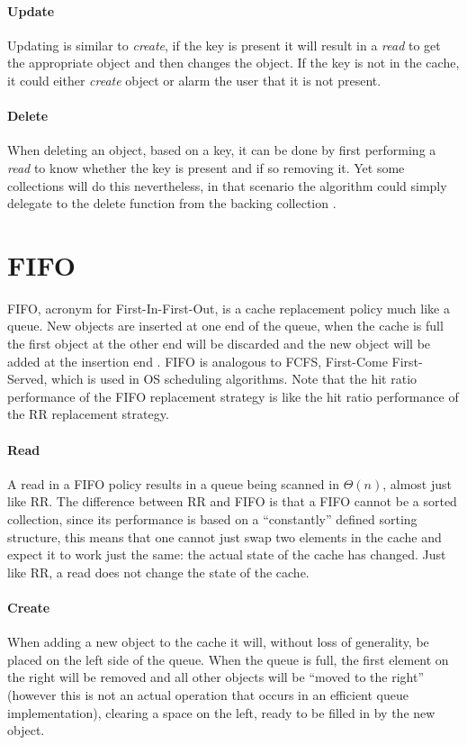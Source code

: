 \documentclass[pdftex,a4paper,12pt,twoside]{report}
\begin{document}
\paragraph{Update} Updating is similar to \emph{create}, if the key is present it will result in a \emph{read} to get the appropriate object and then changes the object. If the key is not in the cache, it could either \emph{create} object or alarm the user that it is not present.
\paragraph{Delete} When deleting an object, based on a key, it can be done by first performing a \emph{read} to know whether the key is present and if so removing it. Yet some collections will do this nevertheless, in that scenario the algorithm could simply delegate to the delete function from the backing collection \citep{random_replacement}.
\section{FIFO}
FIFO, acronym for First-In-First-Out, is a cache replacement policy much like a queue. New objects are inserted at one end of the queue, when the cache is full the first object at the other end will be discarded and the new object will be added at the insertion end \citep{reineke2007timing}. FIFO is analogous to FCFS, First-Come First-Served, which is used in OS scheduling algorithms.
Note that the hit ratio performance of the FIFO replacement strategy is like the hit ratio performance of the RR replacement strategy.
\paragraph{Read} A read in a FIFO policy results in a queue being scanned in $\Theta(n)$, almost just like RR. The difference between RR and FIFO is that a FIFO cannot be a sorted collection, since its performance is based on a ``constantly'' defined sorting structure, this means that one cannot just swap two elements in the cache and expect it to work just the same: the actual state of the cache has changed. Just like RR, a read does not change the state of the cache.
\paragraph{Create} When adding a new object to the cache it will, without loss of generality, be placed on the left side of the queue. When the queue is full, the first element on the right will be removed and all other objects will be ``moved to the right'' (however this is not an actual operation that occurs in an efficient queue implementation), clearing a space on the left, ready to be filled in by the new object.
\end{document}
